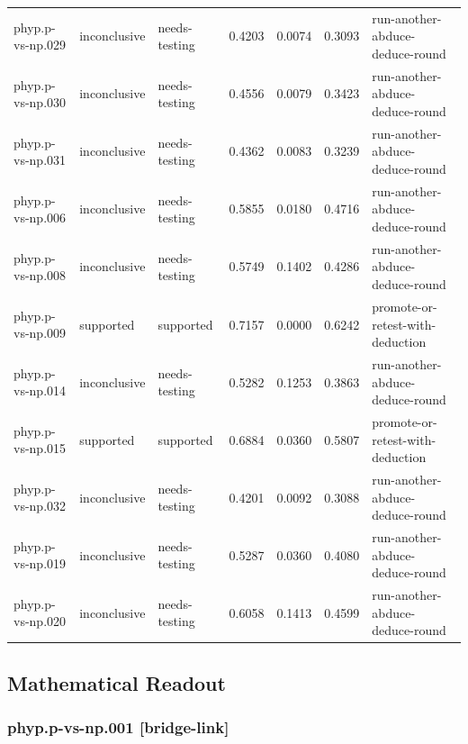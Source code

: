\documentclass[
]{article}
\begin{document}
{\begin{longtable}[]{@{}lllllll@{}}
phyp.p-vs-np.029 & inconclusive & needs-testing & 0.4203 & 0.0074 &
0.3093 & run-another-abduce-deduce-round \\
phyp.p-vs-np.030 & inconclusive & needs-testing & 0.4556 & 0.0079 &
0.3423 & run-another-abduce-deduce-round \\
phyp.p-vs-np.031 & inconclusive & needs-testing & 0.4362 & 0.0083 &
0.3239 & run-another-abduce-deduce-round \\
phyp.p-vs-np.006 & inconclusive & needs-testing & 0.5855 & 0.0180 &
0.4716 & run-another-abduce-deduce-round \\
phyp.p-vs-np.008 & inconclusive & needs-testing & 0.5749 & 0.1402 &
0.4286 & run-another-abduce-deduce-round \\
phyp.p-vs-np.009 & supported & supported & 0.7157 & 0.0000 & 0.6242 &
promote-or-retest-with-deduction \\
phyp.p-vs-np.014 & inconclusive & needs-testing & 0.5282 & 0.1253 &
0.3863 & run-another-abduce-deduce-round \\
phyp.p-vs-np.015 & supported & supported & 0.6884 & 0.0360 & 0.5807 &
promote-or-retest-with-deduction \\
phyp.p-vs-np.032 & inconclusive & needs-testing & 0.4201 & 0.0092 &
0.3088 & run-another-abduce-deduce-round \\
phyp.p-vs-np.019 & inconclusive & needs-testing & 0.5287 & 0.0360 &
0.4080 & run-another-abduce-deduce-round \\
phyp.p-vs-np.020 & inconclusive & needs-testing & 0.6058 & 0.1413 &
0.4599 & run-another-abduce-deduce-round \\
\end{longtable}
}

\subsection{Mathematical Readout}\label{mathematical-readout}

\subsubsection{phyp.p-vs-np.001
{[}bridge-link{]}}\label{phypp-vs-np001-bridge-link}
\end{document}
